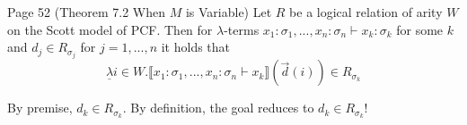 \begin{problem}{Page 52}
    (Theorem 7.2 When $M$ is Variable) Let $R$ be a logical relation of arity $W$ on the Scott model of PCF. Then for $\lambda$-terms $x_1:\sigma_1, ..., x_n:\sigma_n \vdash x_k:\sigma_k$ for some $k$ and $d_j \in R_{\sigma_j}$ for $j =1, ..., n$ it holds that 
$$ \underline{\lambda} i \in W. \llbracket x_1:\sigma_1, ..., x_n : \sigma_n \vdash x_k \rrbracket (\vec{d}(i)) \in R_{\sigma_k} $$
\end{problem}

\begin{solution}
    By premise, $d_k \in R_{\sigma_k}$. By definition, the goal reduces to $d_k \in R_{\sigma_k}$!
\end{solution}